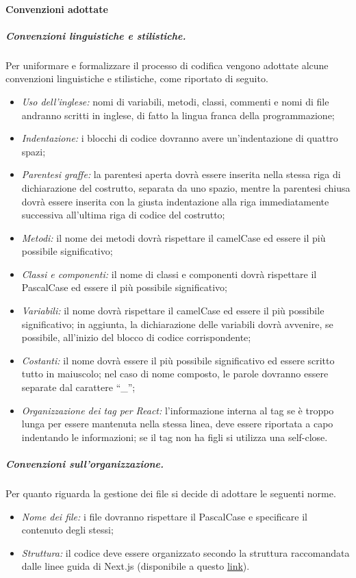 \paragraph{Convenzioni adottate}\label{sec:codifica:convenzioni}
\subparagraph{Convenzioni linguistiche e stilistiche.}
Per uniformare e formalizzare il processo di codifica vengono adottate alcune convenzioni linguistiche e stilistiche, come riportato di seguito.
\begin{itemize}
    \item \textit{Uso dell'inglese:} nomi di variabili, metodi, classi, commenti e nomi di file andranno scritti in inglese, di fatto la lingua franca della programmazione;
    \item \textit{Indentazione:} i blocchi di codice dovranno avere un'indentazione di quattro spazi;
    \item \textit{Parentesi graffe:} la parentesi aperta dovrà essere inserita nella stessa riga di dichiarazione del costrutto, separata da uno spazio, mentre la parentesi chiusa dovrà essere inserita con la giusta indentazione alla riga immediatamente successiva all’ultima riga di codice del costrutto;
    \item \textit{Metodi:} il nome dei metodi dovrà rispettare il camelCase ed essere il più possibile significativo;
    \item \textit{Classi e componenti:} il nome di classi e componenti dovrà rispettare il PascalCase ed essere il più possibile significativo;
    \item \textit{Variabili:} il nome dovrà rispettare il camelCase ed essere il più possibile significativo; in aggiunta, la dichiarazione delle variabili dovrà avvenire, se possibile, all'inizio del blocco di codice corrispondente;
    \item \textit{Costanti:} il nome dovrà essere il più possibile significativo ed essere scritto tutto in maiuscolo; nel caso di nome composto, le parole dovranno essere separate dal carattere ``\_'';
    \item \textit{Organizzazione dei tag per React:} l'informazione interna al tag se è troppo lunga per essere mantenuta nella stessa linea, deve essere riportata a capo indentando le informazioni; se il tag non ha figli si utilizza una self-close.
\end{itemize}

\subparagraph{Convenzioni sull'organizzazione.} Per quanto riguarda la gestione dei file si decide di adottare le seguenti norme.
\begin{itemize}
    \item \textit{Nome dei file:} i file dovranno rispettare il PascalCase e specificare il contenuto degli stessi;
    \item \textit{Struttura:} il codice deve essere organizzato secondo la struttura raccomandata dalle linee guida di Next.js (disponibile a questo \href{https://nextjs.org/docs/app/building-your-application/routing/colocation#project-organization-features}{link}).
\end{itemize}

